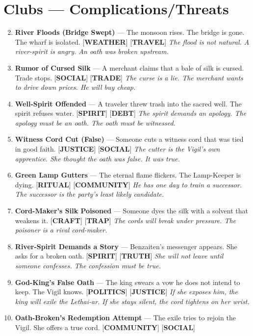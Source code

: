\section*{Clubs --- Complications/Threats}
\label{sec:lethai-ar-complications-revised}
\begin{enumerate}
\setcounter{enumi}{1}
\item \textbf{River Floods (Bridge Swept)} --- The monsoon rises. The bridge is gone. The wharf is isolated. [\textbf{WEATHER}] [\textbf{TRAVEL}]
  \hfill \textit{The flood is not natural. A river-spirit is angry. An oath was broken upstream.}
\item \textbf{Rumor of Cursed Silk} --- A merchant claims that a bale of silk is cursed. Trade stops. [\textbf{SOCIAL}] [\textbf{TRADE}]
  \hfill \textit{The curse is a lie. The merchant wants to drive down prices. He will buy cheap.}
\item \textbf{Well-Spirit Offended} --- A traveler threw trash into the sacred well. The spirit refuses water. [\textbf{SPIRIT}] [\textbf{DEBT}]
  \hfill \textit{The spirit demands an apology. The apology must be an oath. The oath must be witnessed.}
\item \textbf{Witness Cord Cut (False)} --- Someone cuts a witness cord that was tied in good faith. [\textbf{JUSTICE}] [\textbf{SOCIAL}]
  \hfill \textit{The cutter is the Vigil's own apprentice. She thought the oath was false. It was true.}
\item \textbf{Green Lamp Gutters} --- The eternal flame flickers. The Lamp-Keeper is dying. [\textbf{RITUAL}] [\textbf{COMMUNITY}]
  \hfill \textit{He has one day to train a successor. The successor is the party's least likely candidate.}
\item \textbf{Cord-Maker's Silk Poisoned} --- Someone dyes the silk with a solvent that weakens it. [\textbf{CRAFT}] [\textbf{TRAP}]
  \hfill \textit{The cords will break under pressure. The poisoner is a rival cord-maker.}
\item \textbf{River-Spirit Demands a Story} --- Benzaiten's messenger appears. She asks for a broken oath. [\textbf{SPIRIT}] [\textbf{TRUTH}]
  \hfill \textit{She will not leave until someone confesses. The confession must be true.}
\item \textbf{God-King's False Oath} --- The king swears a vow he does not intend to keep. The Vigil knows. [\textbf{POLITICS}] [\textbf{JUSTICE}]
  \hfill \textit{If she exposes him, the king will exile the Lethai-ar. If she stays silent, the cord tightens on her wrist.}
\item \textbf{Oath-Broken's Redemption Attempt} --- The exile tries to rejoin the Vigil. She offers a true cord. [\textbf{COMMUNITY}] [\textbf{SOCIAL}]

\end{enumerate}
